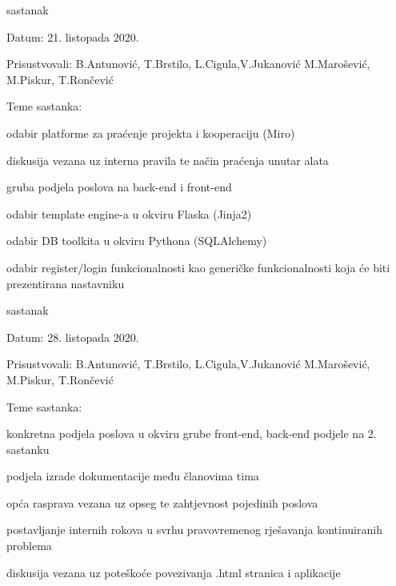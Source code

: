\begin{packed_enum}
			\item  sastanak
			\item[] \begin{packed_item}
				\item Datum: 21. listopada 2020.
				\item Prisustvovali: B.Antunović, T.Brstilo, L.Cigula,V.Jukanović M.Marošević, M.Piskur, T.Rončević
				\item Teme sastanka:
				\begin{packed_item}
					\item  odabir platforme za praćenje projekta i kooperaciju (Miro)
					\item  diskusija vezana uz interna pravila te način praćenja unutar alata
					\item  gruba podjela poslova na back-end i front-end
					\item  odabir template engine-a u okviru Flaska (Jinja2)
					\item  odabir DB toolkita u okviru Pythona (SQLAlchemy)
					\item  odabir register/login funkcionalnosti kao generičke funkcionalnosti koja će biti prezentirana nastavniku
				\end{packed_item}
			\end{packed_item}
			
			\item  sastanak
			\item[] \begin{packed_item}
				\item Datum: 28. listopada 2020.
				\item Prisustvovali: B.Antunović, T.Brstilo, L.Cigula,V.Jukanović M.Marošević, M.Piskur, T.Rončević
				\item Teme sastanka:
				\begin{packed_item}
					\item  konkretna podjela poslova u okviru grube front-end, back-end podjele na 2. sastanku
					\item  podjela izrade dokumentacije među članovima tima
					\item  opća rasprava vezana uz opseg te zahtjevnost pojedinih poslova
					\item  postavljanje internih rokova u svrhu pravovremenog rješavanja kontinuiranih problema
					\item  diskusija vezana uz poteškoće povezivanja .html stranica i aplikacije
				\end{packed_item}
			\end{packed_item}			
			

\end{packed_enum}
